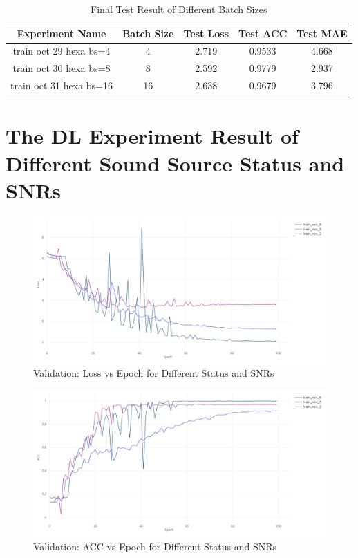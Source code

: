 \begin{table}[H]
    \centering
    \begin{tabular}{|c|c|c|c|c|}
        \hline
         Experiment Name& Batch Size & Test Loss & Test ACC & Test MAE\\
         \hline
         train oct 29 hexa bs=4& 4 & 2.719 & 0.9533 & 4.668\\
         \hline
         train oct 30 hexa bs=8& 8 & 2.592 & 0.9779 & 2.937\\
         \hline
         train oct 31 hexa bs=16& 16 & 2.638 & 0.9679 & 3.796\\
         \hline
    \end{tabular}
    \caption{Final Test Result of Different Batch Sizes}
\end{table}

\section*{The DL Experiment Result of Different Sound Source Status and SNRs}
\begin{figure}[H]
    \centering
    \includegraphics[width=1\linewidth]{figures/StatusSNR Valid_ Loss VS epoch.jpeg}
    \caption{Validation: Loss vs Epoch for Different Status and SNRs}
\end{figure}
\begin{figure}[H]
    \centering
    \includegraphics[width=1\linewidth]{figures/StatusSNR Valid_ ACC VS epoch.jpeg}
    \caption{Validation: ACC vs Epoch for Different Status and SNRs}
\end{figure}
